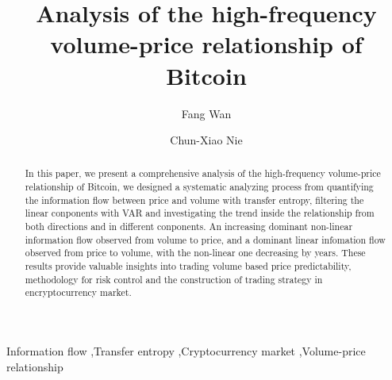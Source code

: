 \documentclass{elsarticle}
\begin{document}
\begin{frontmatter}

\title{Analysis of the high-frequency volume-price relationship of Bitcoin}

\author[mymainaddress]{Fang Wan}

\author[mymainaddress,mysecondaryaddress]{Chun-Xiao Nie}



\address[mymainaddress]{School of Statistics and Mathematics, Zhejiang Gongshang University, Hangzhou 310018, China}
\address[mysecondaryaddress]{Collaborative Innovation Center of Statistical Data Engineering, Technology \& Application, Zhejiang Gongshang University, Hangzhou, 310018, China}

\begin{abstract}
In this paper, we present a comprehensive analysis of the high-frequency volume-price relationship of Bitcoin, we designed a systematic analyzing process from quantifying the information flow between price and volume with transfer entropy, filtering the linear conponents with VAR and investigating the trend inside the relationship from both directions and in different conponents. An increasing dominant non-linear information flow observed from volume to price, and a dominant linear infomation flow observed from price to volume, with the non-linear one decreasing by years. These results provide valuable insights into trading volume based price predictability, methodology for risk control and the construction of trading strategy in encryptocurrency market.
\end{abstract}

\begin{keyword}
Information flow  \sep Transfer entropy \sep Cryptocurrency market \sep Volume-price relationship
\end{keyword}

\end{frontmatter}
%
\linenumbers
\end{document}
